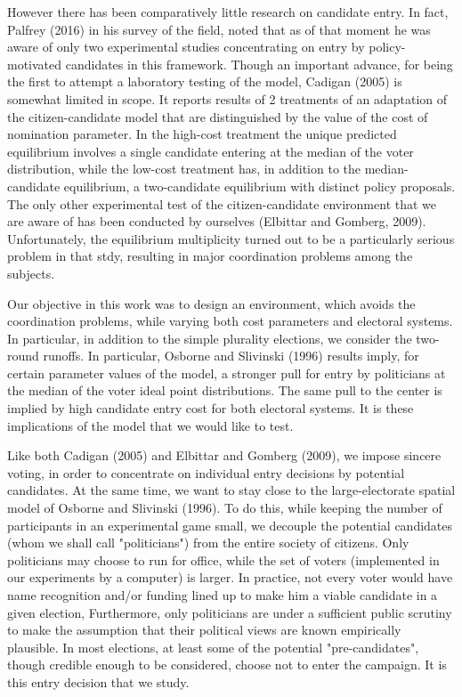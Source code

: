     However there has been comparatively little research on candidate entry. In fact, Palfrey (2016) in his survey of the field, noted that as of that moment he was aware of only two experimental studies concentrating on entry by policy-motivated candidates in this framework. Though an important advance, for being the first to attempt a laboratory testing of the model, Cadigan (2005) is somewhat limited in scope. It reports results of 2 treatments of an adaptation of the citizen-candidate model that are distinguished by the value of the cost of nomination parameter. In the high-cost treatment the unique predicted equilibrium involves a single candidate entering at the median of the voter distribution, while the low-cost treatment has, in addition to the median-candidate equilibrium, a two-candidate equilibrium with distinct policy proposals. The only other experimental test of the citizen-candidate environment that we are aware of has been conducted by ourselves (Elbittar and Gomberg, 2009). Unfortunately, the equilibrium multiplicity turned out to be a particularly serious problem in that stdy, resulting in major coordination problems among the subjects.
    
    Our objective in this work was to design an environment, which avoids the coordination problems, while varying both cost parameters and electoral systems. In particular, in addition to the simple plurality elections, we consider the two-round runoffs. In particular, Osborne and Slivinski (1996) results imply, for certain parameter values of the model, a stronger pull for entry by politicians at the median of the voter ideal point distributions. The same pull to the center is implied by high candidate entry cost for both electoral systems. It is these implications of the model that we would like to test.
    
    Like both Cadigan (2005) and Elbittar and Gomberg (2009), we impose sincere voting, in order to concentrate on individual entry decisions by potential candidates. At the same time, we want to stay close to the large-electorate spatial model of Osborne and Slivinski (1996). To do this, while keeping the number of participants in an experimental game small, we decouple the potential candidates (whom we shall call "politicians") from the entire society of citizens. Only politicians may choose to run for office, while the set of voters (implemented in our experiments by a computer) is larger. In practice, not every voter would have name recognition and/or funding lined up to make him a viable candidate in a given election, Furthermore, only politicians are under a sufficient public scrutiny to make the assumption that their political views are known empirically plausible. In most elections, at least some of the potential "pre-candidates", though credible enough to be considered, choose not to enter the campaign. It is this entry decision that we study.
    
